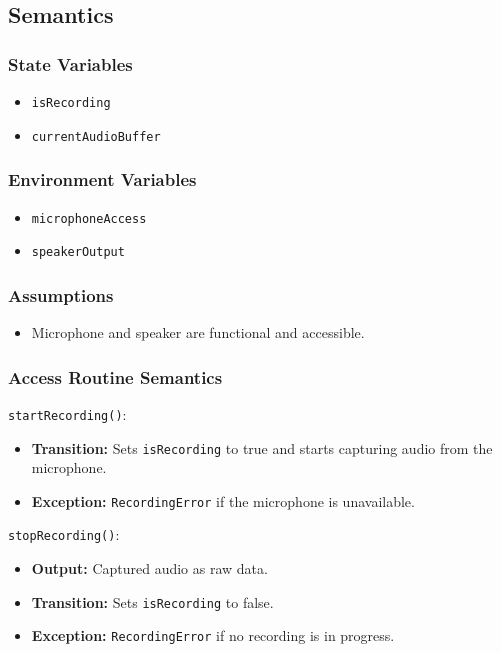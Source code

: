 \documentclass[12pt, titlepage]{article}
\begin{document}
\subsection{Semantics}  

\subsubsection{State Variables}  
\begin{itemize}  
    \item \texttt{isRecording}  
    \item \texttt{currentAudioBuffer}  
\end{itemize}  

\subsubsection{Environment Variables}  
\begin{itemize}  
    \item \texttt{microphoneAccess}  
    \item \texttt{speakerOutput}  
\end{itemize}  

\subsubsection{Assumptions}  
\begin{itemize}  
    \item Microphone and speaker are functional and accessible.  
\end{itemize}  

\subsubsection{Access Routine Semantics}  

\noindent \texttt{startRecording()}:
\begin{itemize}  
    \item \textbf{Transition:} Sets \texttt{isRecording} to true and starts capturing audio from the microphone.  
    \item \textbf{Exception:} \texttt{RecordingError} if the microphone is unavailable.  
\end{itemize}  

\noindent \texttt{stopRecording()}:
\begin{itemize}  
    \item \textbf{Output:} Captured audio as raw data.  
    \item \textbf{Transition:} Sets \texttt{isRecording} to false.  
    \item \textbf{Exception:} \texttt{RecordingError} if no recording is in progress.  
\end{itemize}  
\end{document}
